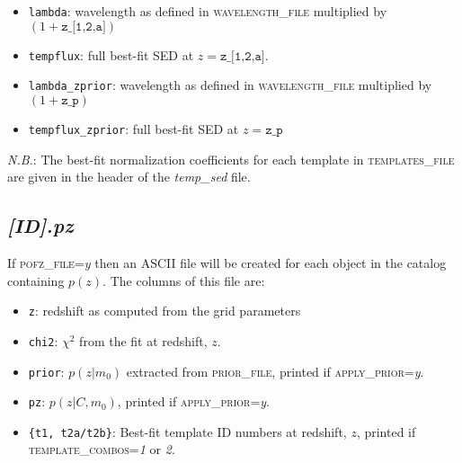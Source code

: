 \documentclass[11pt]{article}
\begin{document}
  \begin{itemize}

    \item \texttt{lambda}: wavelength as defined in \textsc{wavelength\_file} multiplied by $(1+\texttt{z\_[1,2,a]})$ 

    \item \texttt{tempflux}: full best-fit SED at $z=\texttt{z\_[1,2,a]}$.

    \item \texttt{lambda\_zprior}: wavelength as defined in \textsc{wavelength\_file} multiplied by $(1+\texttt{z\_p})$ 

    \item \texttt{tempflux\_zprior}: full best-fit SED at $z=\texttt{z\_p}$
    
  \end{itemize}
  
  \noindent \textit{N.B.}: The best-fit normalization coefficients for each
  template in \textsc{templates\_file} are given in the header of the
  \textit{temp\_sed} file.
  
  \subsection{\textsl{[ID].}\textit{pz} \label{pz}}
    
  If \textsc{pofz\_file}=\textsl{y} then an ASCII file will be created for each
  object in the catalog containing $p(z)$.  The columns of this file are:
    
  \begin{itemize}
    
    \item \texttt{z}: redshift as computed from the grid parameters
    
    \item \texttt{chi2}: $\chi^2$ from the fit at redshift, $z$.

    \item \texttt{prior}: $p(z|m_0)$ extracted from \textsc{prior\_file},
    printed if \textsc{apply\_prior}=\textsl{y}.

    \item \texttt{pz}: $p(z|C, m_0)$, printed if \textsc{apply\_prior}=\textsl{y}.

    \item \texttt{\{t1, t2a/t2b\}}: Best-fit template ID numbers at redshift,
    $z$, printed if \textsc{template\_combos}=\textsl{1} or \textsl{2}.
 
  \end{itemize}
\end{document}
